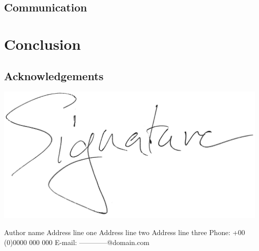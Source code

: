 \documentclass[pdftex,12pt,a4paper]{article}
\begin{document}
\restoregeometry

\newpage

\subsection{Communication}
\blindtext		%

\section{\textbf{Conclusion}}
\blindtext		%

\subsection{Acknowledgements}
\blindtext		%

\vspace{10mm}
\includegraphics[scale=0.06]{Images/Signature}	%
\vspace{6mm}

\noindent	%
Author name \newline	%
Address line one \newline
Address line two \newline
Address line three \newline
Phone: +00 (0)0000 000 000 \newline
E-mail: ------------@domain.com \newline
\end{document}
